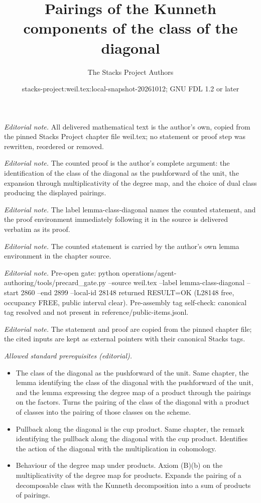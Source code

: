 \documentclass[10pt,a4paper]{amsart}
\title{Pairings of the Kunneth components of the class of the diagonal}
\author{The Stacks Project Authors}
\date{stacks-project:weil.tex:local-snapshot-20261012; GNU FDL 1.2 or later}
\theoremstyle{plain}
\theoremstyle{definition}
\theoremstyle{remark}
\numberwithin{equation}{subsection}
\begin{document}
\maketitle
\noindent\textit{Editorial note.} All delivered mathematical text is the author's own, copied from the pinned Stacks Project chapter file weil.tex; no statement or proof step was rewritten, reordered or removed.\par\medskip
\noindent\textit{Editorial note.} The counted proof is the author's complete argument: the identification of the class of the diagonal as the pushforward of the unit, the expansion through multiplicativity of the degree map, and the choice of dual class producing the displayed pairings.\par\medskip
\noindent\textit{Editorial note.} The label lemma-class-diagonal names the counted statement, and the proof environment immediately following it in the source is delivered verbatim as its proof.\par\medskip
\noindent\textit{Editorial note.} The counted statement is carried by the author's own lemma environment in the chapter source.\par\medskip
\noindent\textit{Editorial note.} Pre-open gate: python operations/agent-authoring/tools/precard\_gate.py --source weil.tex --label lemma-class-diagonal --start 2860 --end 2899 --local-id 28148 returned RESULT=OK (L28148 free, occupancy FREE, public interval clear). Pre-assembly tag self-check: canonical tag resolved and not present in reference/public-items.jsonl.\par\medskip
\noindent\textit{Editorial note.} The statement and proof are copied from the pinned chapter file; the cited inputs are kept as external pointers with their canonical Stacks tags.\par\medskip
\noindent\textit{Allowed standard prerequisites (editorial).}\begin{itemize}
\item The class of the diagonal as the pushforward of the unit. Same chapter, the lemma identifying the class of the diagonal with the pushforward of the unit, and the lemma expressing the degree map of a product through the pairings on the factors. Turns the pairing of the class of the diagonal with a product of classes into the pairing of those classes on the scheme.
\item Pullback along the diagonal is the cup product. Same chapter, the remark identifying the pullback along the diagonal with the cup product. Identifies the action of the diagonal with the multiplication in cohomology.
\item Behaviour of the degree map under products. Axiom (B)(b) on the multiplicativity of the degree map for products. Expands the pairing of a decomposable class with the Kunneth decomposition into a sum of products of pairings.
\end{itemize}\medskip
\end{document}
